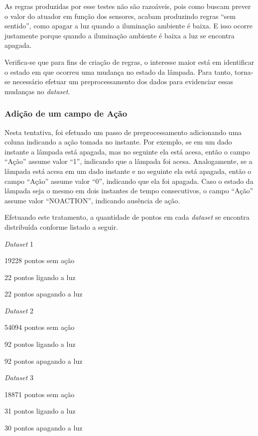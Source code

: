 As regras produzidas por esse testes não são razoáveis, pois como buscam prever o valor do atuador em função dos sensores, acabam produzindo regras ``sem sentido'', como apagar a luz quando a iluminação ambiente é baixa. E isso ocorre justamente porque quando a iluminação ambiente é baixa a luz se encontra apagada.

Verifica-se que para fins de criação de regras, o interesse maior está em identificar o estado em que ocorreu uma mudança no estado da lâmpada. Para tanto, torna-se necessário efetuar um preprocessamento dos dados para evidenciar essas mudanças no \textit{dataset}.

\clearpage

\subsubsection{Adição de um campo de Ação}
\label{subsubsec:action_add}
Nesta tentativa, foi efetuado um passo de preprocessamento adicionando uma coluna indicando a ação tomada no instante. Por exemplo, se em um dado instante a lâmpada está apagada, mas no seguinte ela está acesa, então o campo ``Ação'' assume valor ``1'', indicando que a lâmpada foi acesa. Analogamente, se a lâmpada está acesa em um dado instante e no seguinte ela está apagada, então o campo ``Ação'' assume valor ``0'', indicando que ela foi apagada. Caso o estado da lâmpada seja o mesmo em dois instantes de tempo consecutivos, o campo ``Ação'' assume valor ``NO\underline{\space}ACTION'', indicando ausência de ação.

Efetuando este tratamento, a quantidade de pontos em cada \textit{dataset} se encontra distribuída conforme listado a seguir.

\begin{itemize_compact}
	\item \textit{Dataset} 1
	\begin{itemize_compact}
		\item 19228 pontos sem ação
		\item 22 pontos ligando a luz
		\item 22 pontos apagando a luz
	\end{itemize_compact}
		\item \textit{Dataset} 2
	\begin{itemize_compact}
		\item 54094 pontos sem ação
		\item 92 pontos ligando a luz
		\item 92 pontos apagando a luz
	\end{itemize_compact}
		\item \textit{Dataset} 3
	\begin{itemize_compact}
		\item 18871 pontos sem ação
		\item 31 pontos ligando a luz
		\item 30 pontos apagando a luz
	\end{itemize_compact}
\end{itemize_compact}

